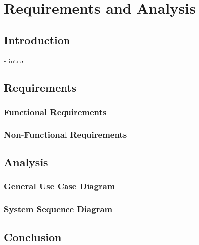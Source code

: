 

\chapter{Requirements and Analysis}

\ifpdf
    \graphicspath{{Chapter3/Figs/Raster/}{Chapter3/Figs/PDF/}{Chapter3/Figs/}}
\else
    \graphicspath{{Chapter3/Figs/Vector/}{Chapter3/Figs/}}
\fi


\section{Introduction}
- intro

\section{Requirements}
    \subsection{Functional Requirements}
    \subsection{Non-Functional Requirements}

\section{Analysis}
    \subsection{General Use Case Diagram}
    \subsection{System Sequence Diagram}

\section{Conclusion}